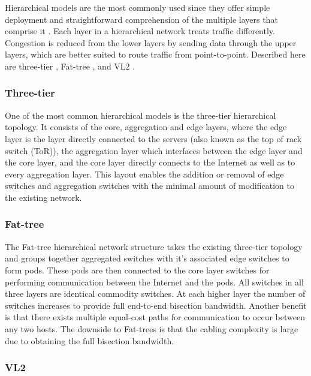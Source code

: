 \documentclass[12pt]{article}
\begin{document}
Hierarchical models are the most commonly used since they offer simple deployment and straightforward comprehension of the multiple layers that comprise it \cite{wang2015survey, xia2016survey}. Each layer in a hierarchical network treats traffic differently. Congestion is reduced from the lower layers by sending data through the upper layers, which are better suited to route traffic from point-to-point. Described here are three-tier \cite{kliazovich2012greencloud}, Fat-tree \cite{al2008scalable}, and VL2 \cite{greenberg2009vl2}.

\subsubsection{Three-tier} \label{subp:three-tier}

One of the most common hierarchical models is the three-tier hierarchical topology. It consists of the core, aggregation and edge layers, where the edge layer is the layer directly connected to the servers (also known as the top of rack switch (ToR)), the aggregation layer which interfaces between the edge layer and the core layer, and the core layer directly connects to the Internet as well as to every aggregation layer. This layout enables the addition or removal of edge switches and aggregation switches with the minimal amount of modification to the existing network.

\subsubsection{Fat-tree} \label{subp:fat-tree}

The Fat-tree hierarchical network structure takes the existing three-tier topology and groups together aggregated switches with it's associated edge switches to form pods. These pods are then connected to the core layer switches for performing communication between the Internet and the pods. All switches in all three layers are identical commodity switches. At each higher layer the number of switches increases to provide full end-to-end bisection bandwidth. Another benefit is that there exists multiple equal-cost paths for communication to occur between any two hosts. The downside to Fat-trees is that the cabling complexity is large due to obtaining the full bisection bandwidth.

\subsubsection{VL2} \label{subp:vl2}
\end{document}
